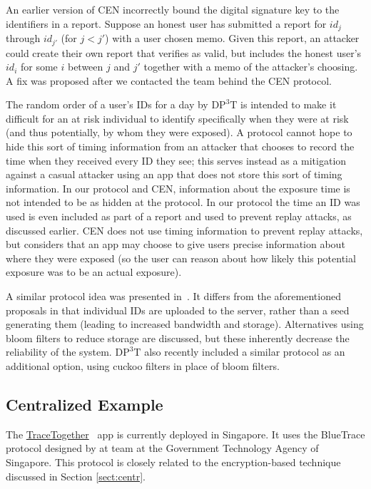 \documentclass{article}
\begin{document}
An earlier version of CEN incorrectly bound the digital signature key to the identifiers in a report.
Suppose an honest user has submitted a report for $id_{j}$ through $id_{j'}$ (for $j<j'$) with a user chosen memo. 
Given this report, an attacker could create their own report that verifies as valid, but includes the honest user's $id_{i}$ for some $i$ between $j$ and $j'$ together with a memo of the attacker's choosing.
A fix was proposed after we contacted the team behind the CEN protocol.

The random order of a user's IDs for a day by $\mathrm{DP^3T}$ is intended to make it difficult for an at risk individual to identify specifically when they were at risk (and thus potentially, by whom they were exposed).
A protocol cannot hope to hide this sort of timing information from an attacker that chooses to record the time when they received every ID they see; this serves instead as a mitigation against a casual attacker using an app that does not store this sort of timing information.  
In our protocol and CEN, information about the exposure time is not intended to be as hidden at the protocol. In our protocol the time an ID was used is even included as part of a report and used to prevent replay attacks, as discussed earlier.
CEN does not use timing information to prevent replay attacks, but considers that an app may choose to give users precise information about where they were exposed (so the user can reason about how likely this potential exposure was to be an actual exposure).

A similar protocol idea was presented in~\cite{BU}. 
It differs from the aforementioned proposals in that 
individual IDs are uploaded to the server, rather than a seed generating them (leading to increased bandwidth and storage).
Alternatives using bloom filters to reduce storage are discussed, but these inherently decrease the reliability of the system. $\mathrm{DP^3T}$ also recently included a similar protocol as an additional option, using cuckoo filters in place of bloom filters.

\subsection{Centralized Example}
The \href{https://www.tracetogether.gov.sg/}{TraceTogether}~\cite{tracetogether} app is currently deployed in Singapore.
It uses the BlueTrace protocol designed by at team at the Government Technology Agency of Singapore.
This protocol is closely related to the encryption-based technique discussed in Section \ref{sect:centr}.
\end{document}
